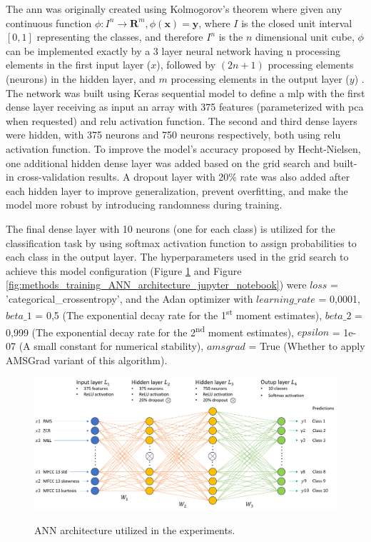The \gls{ann} was originally created using Kolmogorov's theorem where given any continuous function
$\phi: I^n \longrightarrow \mathbf{R}^m, \phi(\mathbf{x})=\mathbf{y}$, where $I$ is the closed unit interval $[0,1]$ representing the classes, and therefore $I^n$ is the $n$ dimensional unit cube, $\phi$ can be implemented exactly by a 3 layer neural network having $\mathrm{n}$ processing elements in the first input layer ($x$), followed by $(2 n+1)$ processing elements (neurons) in the hidden layer, and $m$ processing elements in the output layer ($y$) \cite{Hecht-Nielsen1987}. The network was built using Keras sequential model to define a \gls{mlp} with the first dense layer receiving as input an array with 375 features (parameterized with \gls{pca} when requested) and \gls{relu} activation function. The second and third dense layers were hidden, with 375 neurons and 750 neurons respectively, both using \gls{relu} activation function. To improve the model's accuracy proposed by Hecht-Nielsen, one additional hidden dense layer was added based on the grid search and built-in cross-validation results. A dropout layer with 20\% rate was also added after each hidden layer to improve generalization, prevent overfitting, and make the model more robust by introducing randomness during training.

The final dense layer with 10 neurons (one for each class) is utilized for the classification task by using softmax activation function to assign probabilities to each class in the output layer. The hyperparameters used in the grid search to achieve this model configuration (Figure \ref{fig:methods_training_ANN_architecture} and Figure \ref{fig:methods_training_ANN_architecture_jupyter_notebook}) were $loss$ = 'categorical\_crossentropy', and the Adan optimizer with $learning\_rate$ = 0,0001, $beta\_1$ = 0,5 (The exponential decay rate for the 1\textsuperscript{st} moment estimates), $beta\_2$ = 0,999 (The exponential decay rate for the 2\textsuperscript{nd} moment estimates), $epsilon$ = 1e-07 (A small constant for numerical stability), $amsgrad$ = True (Whether to apply AMSGrad variant \cite{Reddi2018} of this algorithm). 


\begin{figure}[htbp]
    \raggedright
        \caption{ANN architecture utilized in the experiments.}
        \includegraphics[width=1\textwidth]{resources/images/050-methods/Methods_training_ANN_architecture.png}
        \label{fig:methods_training_ANN_architecture}
\end{figure} 


